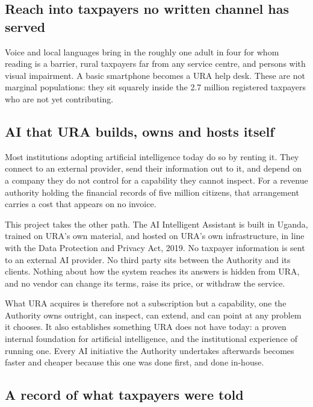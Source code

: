 \documentclass[11pt,a4paper]{article}
\begin{document}
\subsection*{Reach into taxpayers no written channel has served}

Voice and local languages bring in the roughly one adult in four for whom reading is a barrier, rural taxpayers far from any service centre, and persons with visual impairment. A basic smartphone becomes a URA help desk. These are not marginal populations: they sit squarely inside the 2.7 million registered taxpayers who are not yet contributing.

\subsection*{AI that URA builds, owns and hosts itself}

Most institutions adopting artificial intelligence today do so by renting it. They connect to an external provider, send their information out to it, and depend on a company they do not control for a capability they cannot inspect. For a revenue authority holding the financial records of five million citizens, that arrangement carries a cost that appears on no invoice.

This project takes the other path. The AI Intelligent Assistant is built in Uganda, trained on URA's own material, and hosted on URA's own infrastructure, in line with the Data Protection and Privacy Act, 2019. No taxpayer information is sent to an external AI provider. No third party sits between the Authority and its clients. Nothing about how the system reaches its answers is hidden from URA, and no vendor can change its terms, raise its price, or withdraw the service.

What URA acquires is therefore not a subscription but a capability, one the Authority owns outright, can inspect, can extend, and can point at any problem it chooses. It also establishes something URA does not have today: a proven internal foundation for artificial intelligence, and the institutional experience of running one. Every AI initiative the Authority undertakes afterwards becomes faster and cheaper because this one was done first, and done in-house.

\subsection*{A record of what taxpayers were told}
\end{document}
